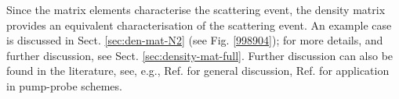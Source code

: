 \documentclass[10pt]{article}
\begin{document}
Since the matrix elements characterise the scattering event, the density matrix provides an equivalent characterisation of the scattering event.
An example case is discussed in Sect. \ref{sec:den-mat-N2} (see Fig. \ref{998904}); for more details, and further discussion, see Sect. \ref{sec:density-mat-full}. Further discussion can also be found in the literature, see, e.g., Ref. \cite{BlumDensityMat} for general discussion, Ref. \cite{Reid1991} for application in pump-probe schemes.





\end{document}
